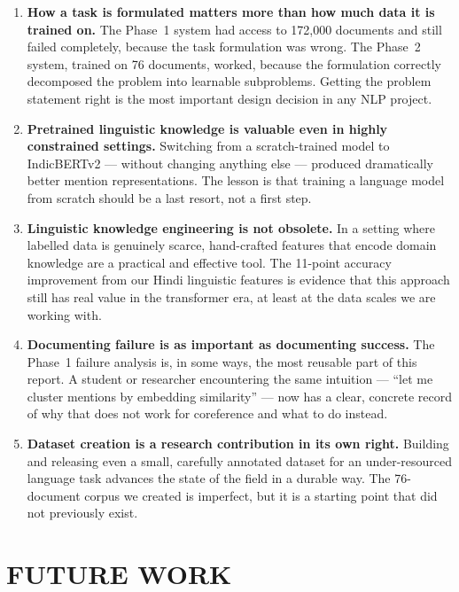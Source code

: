 \documentclass[12pt,a4paper]{report}
\begin{document}
\begin{enumerate}
    \item \textbf{How a task is formulated matters more than how much data it is trained on.} The Phase~1 system had access to 172,000 documents and still failed completely, because the task formulation was wrong. The Phase~2 system, trained on 76 documents, worked, because the formulation correctly decomposed the problem into learnable subproblems. Getting the problem statement right is the most important design decision in any NLP project.

    \item \textbf{Pretrained linguistic knowledge is valuable even in highly constrained settings.} Switching from a scratch-trained model to IndicBERTv2 --- without changing anything else --- produced dramatically better mention representations. The lesson is that training a language model from scratch should be a last resort, not a first step.

    \item \textbf{Linguistic knowledge engineering is not obsolete.} In a setting where labelled data is genuinely scarce, hand-crafted features that encode domain knowledge are a practical and effective tool. The 11-point accuracy improvement from our Hindi linguistic features is evidence that this approach still has real value in the transformer era, at least at the data scales we are working with.

    \item \textbf{Documenting failure is as important as documenting success.} The Phase~1 failure analysis is, in some ways, the most reusable part of this report. A student or researcher encountering the same intuition --- ``let me cluster mentions by embedding similarity'' --- now has a clear, concrete record of why that does not work for coreference and what to do instead.

    \item \textbf{Dataset creation is a research contribution in its own right.} Building and releasing even a small, carefully annotated dataset for an under-resourced language task advances the state of the field in a durable way. The 76-document corpus we created is imperfect, but it is a starting point that did not previously exist.
\end{enumerate}


\chapter{FUTURE WORK}
\end{document}
